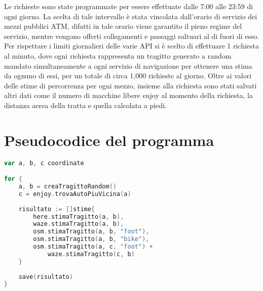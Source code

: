 Le richieste sono state programmate per essere effettuate dalle 7:00 alle 23:59 di ogni giorno. La scelta di tale intervallo è stata vincolata dall'orario di servizio dei mezzi pubblici ATM, difatti in tale orario viene garantito il pieno regime del servizio, mentre vengono offerti collegamenti e passaggi saltuari al di fuori di esso.
Per rispettare i limiti giornalieri delle varie API si è scelto di effettuare 1 richiesta al minuto, dove ogni richiesta rappresenta un tragitto generato a random mandato simultaneamente a ogni servizio di navigazione per ottenere una stima da ognuno di essi, per un totale di circa 1,000 richieste al giorno. Oltre ai valori delle stime di percorrenza per ogni mezzo, insieme alla richiesta sono stati salvati altri dati come il numero di macchine libere enjoy al momento della richiesta, la distanza aerea della tratta e quella calcolata a piedi. 

\section{Pseudocodice del programma}

\begin{lstlisting}[language=Go]
var a, b, c coordinate

for {
	a, b = creaTragittoRandom()
	c = enjoy.trovaAutoPiuVicina(a)
	
	risultato := []stime{
		here.stimaTragitto(a, b),
		waze.stimaTragitto(a, b),
		osm.stimaTragitto(a, b, "foot"),
		osm.stimaTragitto(a, b, "bike"),
		osm.stimaTragitto(a, c, "foot") +
			waze.stimaTragitto(c, b)
	}
	
	save(risultato)
}
\end{lstlisting}